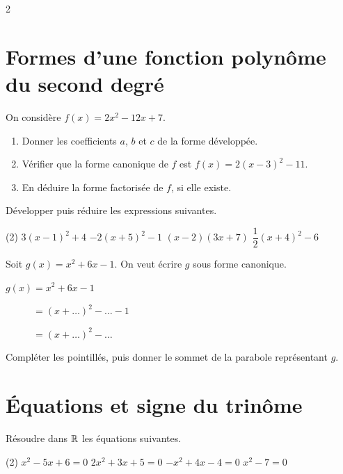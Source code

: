 \documentclass[10pt,a4paper]{article}
\begin{document}
\begin{multicols}{2}

\section{Formes d'une fonction polynôme du second degré}

\begin{exo}
On considère $f(x) = 2x^2 - 12x + 7$.
\begin{enumerate}[leftmargin=*]
    \item Donner les coefficients $a$, $b$ et $c$ de la forme développée.
    \item Vérifier que la forme canonique de $f$ est $f(x) = 2(x-3)^2 - 11$.
    \item En déduire la forme factorisée de $f$, si elle existe.
\end{enumerate}
\end{exo}

\begin{exo}
Développer puis réduire les expressions suivantes.
\begin{tasks}(2)
\task $3(x-1)^2+4$
\task $-2(x+5)^2-1$
\task $(x-2)(3x+7)$
\task $\dfrac12(x+4)^2-6$
\end{tasks}
\end{exo}

\begin{exo}
Soit $g(x) = x^2 + 6x - 1$. On veut écrire $g$ sous forme canonique.
\begin{leftbar}
$g(x) = x^2 + 6x - 1$

$\phantom{g(x)} = (x + \dots)^2 - \dots - 1$

$\phantom{g(x)} = (x + \dots)^2 - \dots$
\end{leftbar}
Compléter les pointillés, puis donner le sommet de la parabole représentant $g$.
\end{exo}

\section{Équations et signe du trinôme}

\begin{exo}
Résoudre dans $\mathbb{R}$ les équations suivantes.
\begin{tasks}(2)
\task $x^2-5x+6=0$
\task $2x^2+3x+5=0$
\task $-x^2+4x-4=0$
\task $x^2-7=0$
\end{tasks}
\end{exo}


\end{multicols}
\end{document}
